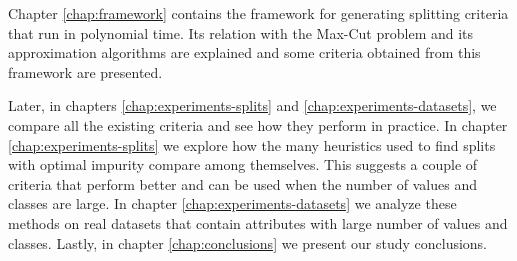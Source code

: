 Chapter \ref{chap:framework} contains the framework for generating splitting criteria that run in polynomial time. Its relation with the Max-Cut problem and its approximation algorithms are explained and some criteria obtained from this framework are presented.

Later, in chapters \ref{chap:experiments-splits} and \ref{chap:experiments-datasets}, we compare all the existing criteria and see how they perform in practice. In chapter \ref{chap:experiments-splits} we explore how the many heuristics used to find splits with optimal impurity compare among themselves. This suggests a couple of criteria that perform better and can be used when the number of values and classes are large. In chapter \ref{chap:experiments-datasets} we analyze these methods on real datasets that contain attributes with large number of values and classes. Lastly, in chapter \ref{chap:conclusions} we present our study conclusions.